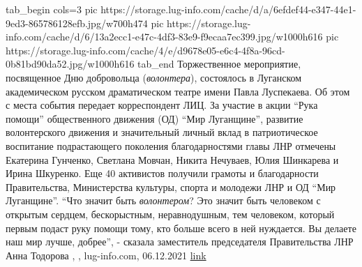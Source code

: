 \ifcmt
  tab_begin cols=3
     pic https://storage.lug-info.com/cache/d/a/6efdef44-e347-44e1-9ed3-865786128efb.jpg/w700h474%
     pic https://storage.lug-info.com/cache/d/6/13a2ecc1-e47c-4df3-83e9-f9ecaa7ec399.jpg/w1000h616%
		 pic https://storage.lug-info.com/cache/4/e/d9678e05-e6c4-4f8a-96cd-0b81bd90da52.jpg/w1000h616%
  tab_end
\fi
Торжественное мероприятие, посвященное Дню добровольца (\emph{волонтера}), состоялось
в Луганском академическом русском драматическом театре имени Павла Луспекаева.
Об этом с места события передает корреспондент ЛИЦ.
За участие в акции \enquote{Рука помощи} общественного движения (ОД) \enquote{Мир Луганщине},
развитие волонтерского движения и значительный личный вклад в патриотическое
воспитание подрастающего поколения благодарностями главы ЛНР отмечены Екатерина
Гунченко, Светлана Мовчан, Никита Нечуваев, Юлия Шинкарева и Ирина Шкуренко.
Еще 40 активистов получили грамоты и благодарности Правительства, Министерства
культуры, спорта и молодежи ЛНР и ОД \enquote{Мир Луганщине}.
\enquote{Что значит быть \emph{волонтером}? Это значит быть человеком с открытым сердцем,
бескорыстным, неравнодушным, тем человеком, который первым подаст руку помощи
тому, кто больше всего в ней нуждается. Вы делаете наш мир лучше, добрее}, -
сказала заместитель председателя Правительства ЛНР Анна Тодорова
, 
, lug-info.com, 06.12.2021
\href{https://lug-info.com/news/pochti-polsotni-aktivistov-poluchili-nagrady-ot-vlastej-lnr-ko-dnyu-volontera}{link}
